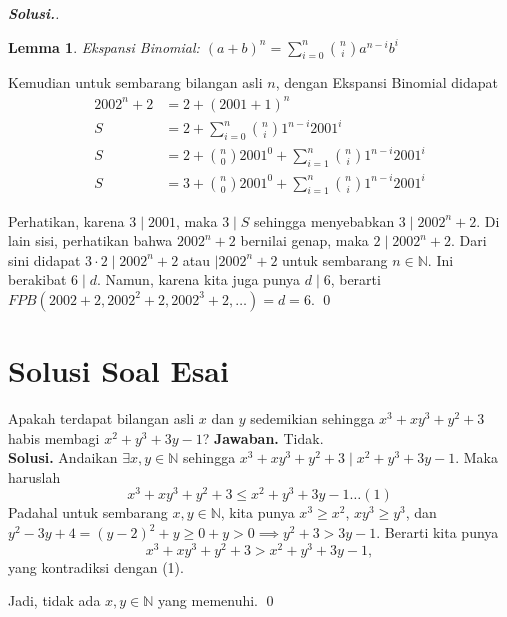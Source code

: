 \documentclass[a4paper,12pt,bahasa]{article}
\newtheorem{lemma}{Lemma} %
\begin{document}
\begin{enumerate}
\begin{proof}[\textbf{Solusi.}]
		\begin{lemma}
					Ekspansi Binomial: $(a+b)^n=\sum_{i=0}^{n} {n \choose i}a^{n-i}b^i$
		\end{lemma}
		
		Kemudian untuk sembarang bilangan asli $n$, dengan Ekspansi Binomial didapat
		\begin{align*}
		2002^n+2 &= 2+(2001+1)^n\\
			S	&= 2 + \sum_{i=0}^{n} {n \choose i}1^{n-i}2001^i\\
			S	&= 2 + {n \choose 0}2001^0 + \sum_{i=1}^{n} {n \choose i}1^{n-i}2001^i\\
			S	&= 3 + {n \choose 0}2001^0 + \sum_{i=1}^{n} {n \choose i}1^{n-i}2001^i
		\end{align*}
			
		Perhatikan, karena $3 \mid 2001$, maka $3 \mid S$ sehingga menyebabkan $3 \mid 2002^n+2$. Di lain sisi, perhatikan bahwa $2002^n+2$ bernilai genap, maka $2 \mid 2002^n +2$. Dari sini didapat $3\cdot2 \mid 2002^n+2$ atau $\mid 2002^n+2$ untuk sembarang $n \in \mathbb{N}$. Ini berakibat $6 \mid d$. Namun, karena kita juga punya $d \mid 6$, berarti $FPB(2002+2,2002^2+2,2002^3+2,\dots)=d=6$. \qed
  \end{proof}

\end{enumerate}

\section{Solusi Soal Esai}
Apakah terdapat bilangan asli $x$ dan $y$ sedemikian sehingga $x^3+xy^3+y^2+3$ habis membagi $x^2+y^3+3y-1$?
	\textbf{Jawaban. }
	Tidak.\\
 
	\textbf{Solusi. }
	Andaikan $\exists x,y \in \mathbb{N}$ sehingga $x^3+xy^3+y^2+3 \mid x^2+y^3+3y-1$. Maka haruslah 
	 $$x^3+xy^3+y^2+3 \le x^2+y^3+3y-1 \dots (1)$$
	Padahal untuk sembarang $x,y \in \mathbb{N}$, kita punya $x^3 \ge x^2$,   $xy^3 \ge y^3$, dan\\ $y^2-3y+4 = (y-2)^2+y \ge 0 + y > 0 \implies y^2+3 > 3y -1$. Berarti kita punya $$x^3+xy^3+y^2+3 > x^2+y^3+3y-1,$$ yang kontradiksi dengan (1).
	
	Jadi, tidak ada $x,y \in \mathbb{N}$ yang memenuhi. \qed
\end{document}
